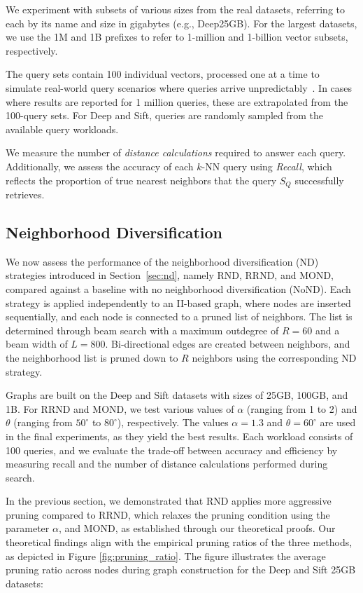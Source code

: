 We experiment with subsets of various sizes from the real datasets, referring to each by its name and size in gigabytes (e.g., Deep25GB). For the largest datasets, we use the 1M and 1B prefixes to refer to 1-million and 1-billion vector subsets, respectively.

The query sets contain 100 individual vectors, processed one at a time to simulate real-world query scenarios where queries arrive unpredictably~\cite{itsawreport,DBLP:conf/edbt/GogolouTPB19,conf/sigmod/gogolou20}. In cases where results are reported for 1 million queries, these are extrapolated from the 100-query sets. For Deep and Sift, queries are randomly sampled from the available query workloads.

We measure the number of \textit{distance calculations} required to answer each query. Additionally, we assess the accuracy of each \(k\)-NN query using \textit{Recall}, which reflects the proportion of true nearest neighbors that the query \(S_Q\) successfully retrieves.

\subsection{Neighborhood Diversification}
\label{subsec:experiments-ND}

We now assess the performance of the neighborhood diversification (ND) strategies introduced in Section~\ref{sec:nd}, namely RND, RRND, and MOND, compared against a baseline with no neighborhood diversification (NoND). Each strategy is applied independently to an II-based graph, where nodes are inserted sequentially, and each node is connected to a pruned list of neighbors. The list is determined through beam search with a maximum outdegree of \(R = 60\) and a beam width of \(L = 800\). Bi-directional edges are created between neighbors, and the neighborhood list is pruned down to \(R\) neighbors using the corresponding ND strategy.

Graphs are built on the Deep and Sift datasets with sizes of 25GB, 100GB, and 1B. For RRND and MOND, we test various values of \(\alpha\) (ranging from 1 to 2) and \(\theta\) (ranging from \(50^\circ\) to \(80^\circ\)), respectively. The values \(\alpha = 1.3\) and \(\theta = 60^\circ\) are used in the final experiments, as they yield the best results. Each workload consists of 100 queries, and we evaluate the trade-off between accuracy and efficiency by measuring recall and the number of distance calculations performed during search.

 In the previous section, we demonstrated that RND applies more aggressive pruning compared to RRND, which relaxes the pruning condition using the parameter \(\alpha\), and MOND, as established through our theoretical proofs. Our theoretical findings align with the empirical pruning ratios of the three methods, as depicted in Figure \ref{fig:pruning_ratio}. The figure illustrates the average pruning ratio across nodes during graph construction for the Deep and Sift 25GB datasets:

